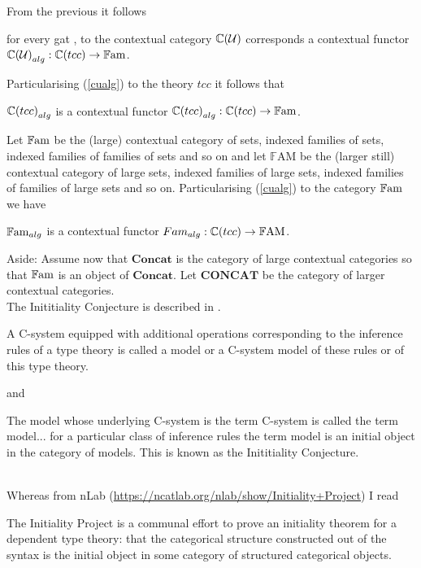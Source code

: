\documentclass[10pt,a4paper]{article}
\theoremstyle{remark}
\newcommand{\catofccs}{\mathbf{Concat}}
\newcommand{\catoflargerccs}{\mathbf{CONCAT}}
\newcommand{\alg}[1]{{#1}_{alg}}
\newcommand{\FAM}{\ensuremath{\mathbb{F\mathrm{AM}} }}
\begin{document}
\note
From the previous it follows 
\begin{pointeq}
\label{cualg}
for every gat \gat[U], to the contextual category $\mathbb{C}(\mathcal{U})$ corresponds a contextual functor
   $\alg{\CofU} :\ccat[C](tcc) \morph \Fam$. \\
\end{pointeq} 

\note Particularising (\ref{cualg}) to the theory $tcc$ it follows that
\begin{pointeq}
  $\alg{\ccat[C](tcc)}$ is a contextual functor   $\alg{\ccat[C](tcc)} :\ccat[C](tcc) \morph \Fam$.
\end{pointeq}

\note
Let $\mathbb{F\mathrm{am}} $ be the (large) contextual category of sets, indexed families of sets, indexed families of families of sets and so on and
let $\FAM$ be the (larger still) contextual category of large sets, indexed families of large sets, indexed families of families of large sets and so on.
Particularising (\ref{cualg}) to the category $\mathbb{F\mathrm{am}} $ we have
\begin{pointeq}
  \label{inducedalgebra}
  $\alg{\Fam}$ is a contextual functor   $\alg{Fam} :\ccat[C](tcc) \morph \FAM$. 
\end{pointeq}

\note
Aside: Assume now that $\catofccs$ is the category of large contextual categories so that $\mathbb{F\mathrm{am}} $ is an object of $\catofccs$. 
Let $\catoflargerccs$ be the category of larger contextual categories. \\

\note The Inititiality Conjecture is described in \cite{VoevodskyInitialityConjecture}.
\begin{tightquote}
A C-system equipped with additional
operations corresponding to the inference rules of a type theory is called a
model or a C-system model of these rules or of this type theory.
\end{tightquote}
and
\begin{tightquote}
The model whose underlying
C-system is the term C-system is called the term model... for a particular
class of inference rules the term model is an initial object in the category of models.
This is known as the Inititiality Conjecture.
\end{tightquote} 
\ \\
\note Whereas from nLab (\url{https://ncatlab.org/nlab/show/Initiality+Project}) I read
\begin{tightquote}
The Initiality Project is a communal effort to prove an initiality theorem for a dependent type theory: that the categorical structure constructed out of the syntax is the initial object in some category of structured categorical objects.
\end{tightquote}
\end{document}
